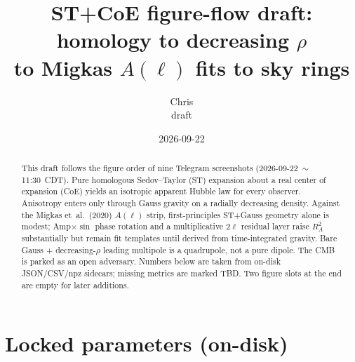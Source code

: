 \documentclass[11pt,letterpaper]{article}
\title{ST+CoE figure-flow draft: homology to decreasing $\rho$\\
to Migkas $A(\ell)$ fits to sky rings}
\author{Chris\\{\small draft}}
\date{2026-09-22}
\begin{document}
\maketitle

\begin{abstract}
This draft follows the figure order of nine Telegram screenshots
(2026-09-22~$\sim$11:30~CDT). Pure homologous Sedov--Taylor (ST) expansion
about a real center of expansion (CoE) yields an isotropic apparent Hubble
law for every observer. Anisotropy enters only through Gauss gravity on a
radially decreasing density. Against the Migkas et~al.\ (2020) $A(\ell)$
strip, first-principles ST+Gauss geometry alone is modest; Amp$\times\sin$
phase rotation and a multiplicative $2\ell$ residual layer raise $R^2_A$
substantially but remain fit templates until derived from time-integrated
gravity. Bare Gauss + decreasing-$\rho$ leading multipole is a quadrupole,
not a pure dipole. The CMB is parked as an open adversary. Numbers below
are taken from on-disk JSON/CSV/npz sidecars; missing metrics are marked TBD.
Two figure slots at the end are empty for later additions.
\end{abstract}

\tableofcontents
\newpage

\section{Locked parameters (on-disk)}
\label{sec:params}
\end{document}
